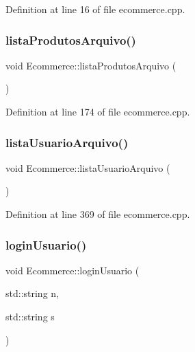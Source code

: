 Definition at line 16 of file ecommerce.\+cpp.

\mbox{\label{class_ecommerce_a82389edab259d453650aaf497ea4a45c}} 
\subsubsection{\texorpdfstring{lista\+Produtos\+Arquivo()}{listaProdutosArquivo()}}
{\footnotesize\ttfamily void Ecommerce\+::lista\+Produtos\+Arquivo (\begin{DoxyParamCaption}{ }\end{DoxyParamCaption})}



Definition at line 174 of file ecommerce.\+cpp.

\mbox{\label{class_ecommerce_a0b9df17b27ee437cd1c0349a91fa4de3}} 
\subsubsection{\texorpdfstring{lista\+Usuario\+Arquivo()}{listaUsuarioArquivo()}}
{\footnotesize\ttfamily void Ecommerce\+::lista\+Usuario\+Arquivo (\begin{DoxyParamCaption}{ }\end{DoxyParamCaption})}



Definition at line 369 of file ecommerce.\+cpp.

\mbox{\label{class_ecommerce_aefbb7d614ba1bcf82d6f8f5730bf2ec8}} 
\subsubsection{\texorpdfstring{login\+Usuario()}{loginUsuario()}\hspace{0.1cm}{\footnotesize\ttfamily [1/2]}}
{\footnotesize\ttfamily void Ecommerce\+::login\+Usuario (\begin{DoxyParamCaption}\item[{std\+::string}]{n,  }\item[{std\+::string}]{s }\end{DoxyParamCaption})}

